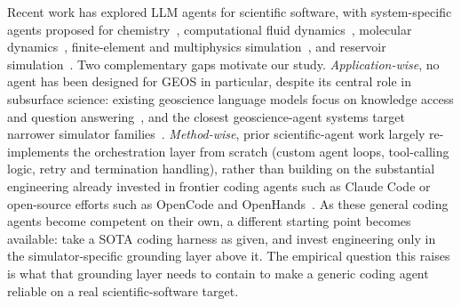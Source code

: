 \documentclass{article}
\begin{document}
Recent work has explored LLM agents for scientific software, with system-specific agents proposed for chemistry~\citep{bran2024chemcrow,boiko2023coscientist}, computational fluid dynamics~\citep{chen2024metaopenfoam,yue2025foamagent,pandey2025openfoamgpt}, molecular dynamics~\citep{shi2026mdagent2,zhao2026polyjarvis,guilbert2025dynamate}, finite-element and multiphysics simulation~\citep{zhan2025mooseagent,mcpsim2026,ni2024mechagents}, and reservoir simulation~\citep{moyner2026jutulgpt}. Two complementary gaps motivate our study. \emph{Application-wise}, no agent has been designed for GEOS in particular, despite its central role in subsurface science: existing geoscience language models focus on knowledge access and question answering~\citep{deng2023k2,lin2024geogalactica}, and the closest geoscience-agent systems target narrower simulator families~\citep{bekele2025geosim,li2025seismologyagent,moyner2026jutulgpt}. \emph{Method-wise}, prior scientific-agent work largely re-implements the orchestration layer from scratch (custom agent loops, tool-calling logic, retry and termination handling), rather than building on the substantial engineering already invested in frontier coding agents such as Claude Code or open-source efforts such as OpenCode and OpenHands~\citep{wang2024openhands}. As these general coding agents become competent on their own, a different starting point becomes available: take a SOTA coding harness as given, and invest engineering only in the simulator-specific grounding layer above it. The empirical question this raises is what that grounding layer needs to contain to make a generic coding agent reliable on a real scientific-software target.
\end{document}
